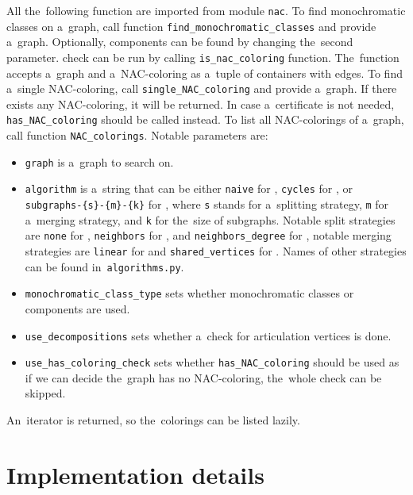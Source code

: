 All the~following function are imported from module \texttt{nac}.
To find monochromatic classes on a~graph,
call function \texttt{find\_monochromatic\_classes} and provide a~graph.
Optionally, \trcon{} components can be found by changing the~second parameter.
%
\IsNACColoring{} check can be run by calling \texttt{is\_nac\_coloring} function.
The~function accepts a~graph and a~NAC-coloring
as a~tuple of containers with edges.
%
To find a~single NAC-coloring, call \texttt{single\_NAC\_coloring} and provide
a~graph. If there exists any NAC-coloring, it will be returned.
In case a~certificate is not needed,
\texttt{has\_NAC\_coloring} should be called instead.
%
To list all NAC-colorings of a~graph, call function \texttt{NAC\_colorings}.
Notable parameters are:
\begin{itemize}
	\item \texttt{graph} is a~graph to search on.
	\item \texttt{algorithm} is a~string that can be either
	      \texttt{naive} for \Naive{},
	      \texttt{cycles} for \NaiveCycles{},
	      or \texttt{subgraphs-\{s\}-\{m\}-\{k\}} for \Subgraphs{},
	      where \texttt{s} stands for a~splitting strategy,
	      \texttt{m} for a~merging strategy,
	      and \texttt{k} for the~size of subgraphs.
	      Notable split strategies are
	      \texttt{none} for \None{},
	      \texttt{neighbors} for \Neighbors{}, and
	      \texttt{neighbors\_degree} for \NeighborsDegree{},
	      notable merging strategies are
	      \texttt{linear} for \MergeLinear{} and
	      \texttt{shared\_vertices} for \SharedVertices{}.
	      Names of other strategies can be found in~\texttt{algorithms.py}.
	\item \texttt{monochromatic\_class\_type} sets
	      whether monochromatic classes or \trcon{} components are used.
	\item \texttt{use\_decompositions} sets
	      whether a~check for articulation vertices is done.
	\item \texttt{use\_has\_coloring\_check} sets
	      whether \texttt{has\_NAC\_coloring} should be used
	      as if we can decide the~graph has no NAC-coloring,
	      the~whole check can be skipped.
\end{itemize}
%
An~iterator is returned, so the~colorings can be listed lazily.


\section{Implementation details}

